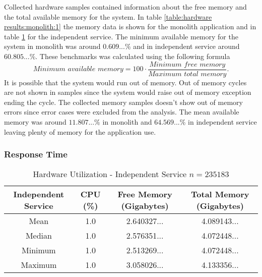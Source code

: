 Collected hardware samples contained information about the free memory and the total available memory for the system.
In table \ref{table:hardware results:monolith:1} the memory data is shown for the monolith application and in table \ref{table:hardware results:independent service:1} for the independent service.
The minimum available memory for the system in monolith was around $0.609...\%$ and in independent service around $60.805...\%$.
These benchmarks was calculated using the following formula
\[
\textit{Minimum available memory} = 100 \cdot \frac{\textit{Minimum free memory}}{\textit{Maximum total memory}}
.\]
It is possible that the system would run out of memory.
Out of memory cycles are not shown in samples since the system would raise out of memory exception ending the cycle.
The collected memory samples doesn't show out of memory errors since error cases were excluded from the analysis.
The mean available memory was around $11.807...\%$ in monolith and $64.569...\%$ in independent service leaving plenty of memory for the application use.

\subsubsection{Response Time}
\begin{table}[h!]
       \begin{tabular}{|c|c|c|c|} 
        \hline
        Independent Service
        & CPU (\%)
        & Free Memory (Gigabytes)
        & Total Memory (Gigabytes) \\ [0.5ex] 
        
        \hline\hline
        Mean
        & 1.0
        & 2.640327...
        & 4.089143... \\ 
        
        Median
        & 1.0
        & 2.576351...
        & 4.072448... \\ 

        Minimum
        & 1.0
        & 2.513269...
        & 4.072448...\\ 
        
        Maximum
        & 1.0
        & 3.058026...
        & 4.133356... \\
        \hline
    \end{tabular}
    \caption{Hardware Utilization - Independent Service $n=235183$}
    \label{table:hardware results:independent service:1}
\end{table}

